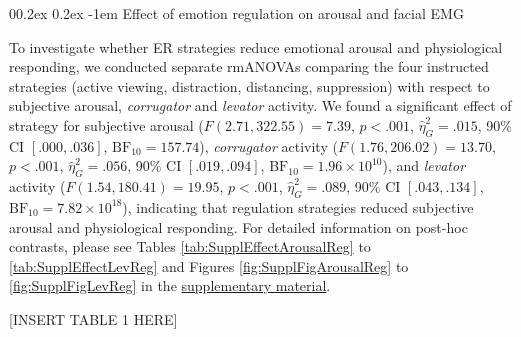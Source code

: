 \documentclass[
  man,floatsintext]{apa6}
\makeatletter
\let\oldparagraph\paragraph
\renewcommand{\paragraph}[1]{\oldparagraph{#1}\mbox{}}
\renewcommand{\paragraph}{\@startsection{paragraph}{4}{\parindent}%
  {0\baselineskip \@plus 0.2ex \@minus 0.2ex}%
  {-1em}%
  {\normalfont\normalsize\bfseries\itshape\typesectitle}}
\makeatother
\begin{document}
\hypertarget{effect-of-emotion-regulation-on-arousal-and-facial-emg}{%
\paragraph{Effect of emotion regulation on arousal and facial EMG}\label{effect-of-emotion-regulation-on-arousal-and-facial-emg}}

To investigate whether ER strategies reduce emotional arousal and physiological responding, we conducted separate rmANOVAs comparing the four instructed strategies (active viewing, distraction, distancing, suppression) with respect to subjective arousal, \emph{corrugator} and \emph{levator} activity.
We found a significant effect of strategy for subjective arousal (\(F(2.71, 322.55) = 7.39\), \(p < .001\), \(\hat{\eta}^2_G = .015\), 90\% CI \([.000, .036]\), \(\mathrm{BF}_{\textrm{10}} = 157.74\)), \emph{corrugator} activity (\(F(1.76, 206.02) = 13.70\), \(p < .001\), \(\hat{\eta}^2_G = .056\), 90\% CI \([.019, .094]\), \(\mathrm{BF}_{\textrm{10}} = 1.96 \times 10^{10}\)), and \emph{levator} activity (\(F(1.54, 180.41) = 19.95\), \(p < .001\), \(\hat{\eta}^2_G = .089\), 90\% CI \([.043, .134]\), \(\mathrm{BF}_{\textrm{10}} = 7.82 \times 10^{18}\)), indicating that regulation strategies reduced subjective arousal and physiological responding.
For detailed information on post-hoc contrasts, please see Tables \ref{tab:SupplEffectArousalReg} to \ref{tab:SupplEffectLevReg} and Figures \ref{fig:SupplFigArousalReg} to \ref{fig:SupplFigLevReg} in the \protect\hyperlink{SupplementEffectER}{supplementary material}.

{[}INSERT TABLE 1 HERE{]}
\end{document}
